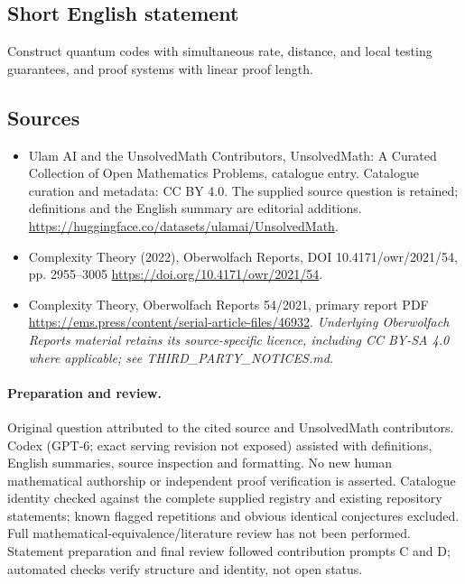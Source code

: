 \documentclass[11pt]{article}
\begin{document}
\subsection{Short English statement}
Construct quantum codes with simultaneous rate, distance, and local testing guarantees, and proof systems with linear proof length.
\subsection{Sources}
\begin{itemize}
\item[\hypertarget{source:statement:1}{S1}] Ulam AI and the UnsolvedMath Contributors, UnsolvedMath: A Curated Collection of Open Mathematics Problems, catalogue entry. Catalogue curation and metadata: CC BY 4.0. The supplied source question is retained; definitions and the English summary are editorial additions.
\url{https://huggingface.co/datasets/ulamai/UnsolvedMath}.
\item[\hypertarget{source:statement:2}{S2}] Complexity Theory (2022), Oberwolfach Reports, DOI 10.4171/owr/2021/54, pp. 2955--3005
\url{https://doi.org/10.4171/owr/2021/54}.
\item[\hypertarget{source:statement:3}{S3}] Complexity Theory, Oberwolfach Reports 54/2021, primary report PDF
\url{https://ems.press/content/serial-article-files/46932}.
\textit{Underlying Oberwolfach Reports material retains its source-specific licence, including CC BY-SA 4.0 where applicable; see THIRD\_PARTY\_NOTICES.md.}
\end{itemize}
\paragraph{Preparation and review.}
Original question attributed to the cited source and UnsolvedMath contributors. Codex (GPT-6; exact serving revision not exposed) assisted with definitions, English summaries, source inspection and formatting. No new human mathematical authorship or independent proof verification is asserted. Catalogue identity checked against the complete supplied registry and existing repository statements; known flagged repetitions and obvious identical conjectures excluded. Full mathematical-equivalence/literature review has not been performed. Statement preparation and final review followed contribution prompts C and D; automated checks verify structure and identity, not open status.
\label{end:statement}
\end{document}
